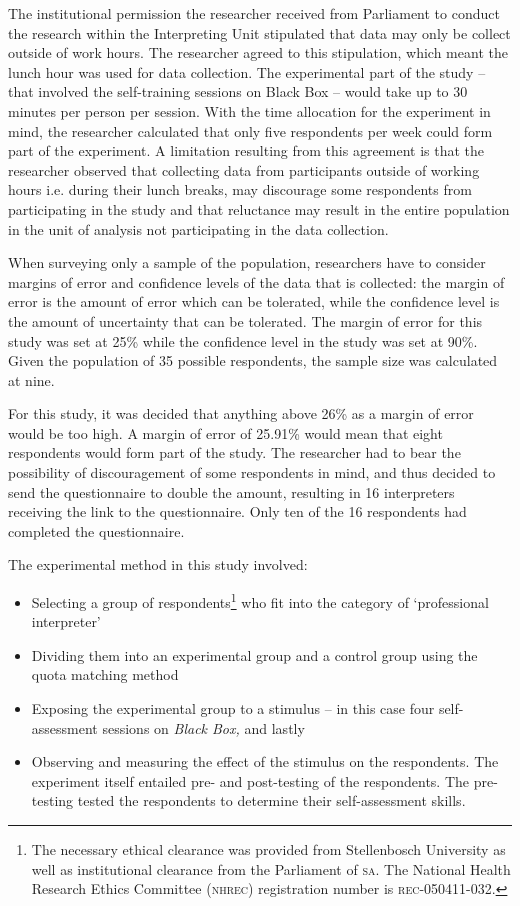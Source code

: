 \documentclass[output=paper]{langsci/langscibook}
\begin{document}
The institutional permission the researcher received from Parliament to conduct the research within the Interpreting Unit stipulated that data may only be collect outside of work hours. The researcher agreed to this stipulation, which meant the lunch hour was used for data collection. The experimental part of the study -- that involved the self-training sessions on Black Box -- would take up to 30 minutes per person per session. With the time allocation for the experiment in mind, the researcher calculated that only five respondents per week could form part of the experiment. A limitation resulting from this agreement is that the researcher observed that collecting data from participants outside of working hours i.e. during their lunch breaks, may discourage some respondents from participating in the study and that reluctance may result in the entire population in the unit of analysis not participating in the data collection. 

When surveying only a sample of the population, researchers have to consider margins of error and confidence levels of the data that is collected: the margin of error is the amount of error which can be tolerated, while the confidence level is the amount of uncertainty that can be tolerated. The margin of error for this study was set at 25\% while the confidence level in the study was set at 90\%. Given the population of 35 possible respondents, the sample size was calculated at nine. 

For this study, it was decided that anything above 26\% as a margin of error would be too high. A margin of error of 25.91\% would mean that eight respondents would form part of the study. The researcher had to bear the possibility of discouragement of some respondents in mind, and thus decided to send the questionnaire to double the amount, resulting in 16 interpreters receiving the link to the questionnaire. Only ten of the 16 respondents had completed the questionnaire.

The experimental method in this study involved:

\begin{itemize}
\item Selecting a group of respondents\footnote{The necessary ethical clearance was provided from Stellenbosch University as well as institutional clearance from the Parliament of \textsc{sa}. The National Health Research Ethics Committee (\textsc{nhrec}) registration number is \textsc{rec-050411-032}.} who fit into the category of ‘professional interpreter’
\item Dividing them into an experimental group and a control group using the quota matching method
\item Exposing the experimental group to a stimulus – in this case four self-assessment sessions on \textit{Black Box,} and lastly
\item Observing and measuring the effect of the stimulus on the respondents. The experiment itself entailed pre- and post-testing of the respondents. The pre-testing tested the respondents to determine their self-assessment skills. 
\end{itemize}
\end{document}
